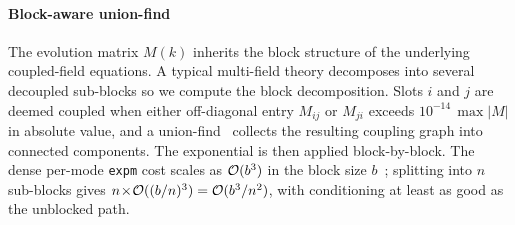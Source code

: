 \paragraph*{Block-aware union-find} The evolution matrix $M(k)$
inherits the block structure of the underlying coupled-field
equations. A typical multi-field theory decomposes into several
decoupled sub-blocks %
so we compute the block decomposition. Slots $i$ and $j$ are deemed
coupled when either off-diagonal entry $M_{ij}$ or $M_{ji}$ exceeds
$10^{-14}\,\max|M|$ in absolute value,
and a union-find~\cite{tarjan1975unionfind} collects the resulting
coupling graph into connected components. The exponential is then
applied block-by-block. The dense per-mode \lstinline!expm! cost
scales as $\mathcal{O}(b^3)$ in the block size
$b$~\cite{higham2009scaling}; splitting into $n$
sub-blocks gives $n\!\times\!\mathcal{O}((b/n)^3)=\mathcal{O}(b^3/n^2)$, with
conditioning at least as good as the unblocked path.

